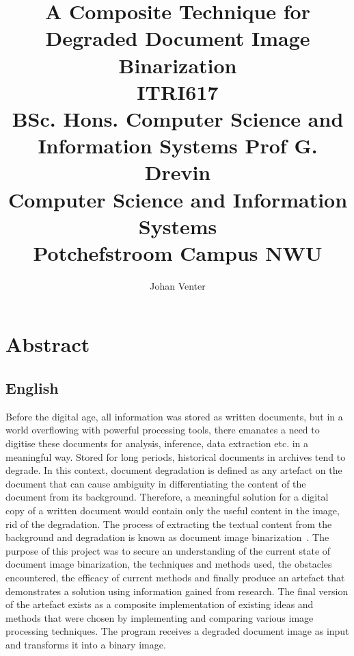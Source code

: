 \documentclass[a4paper, 12pt]{report}
\title{
    A Composite Technique for Degraded Document Image Binarization \\[12pt]
    \large
    ITRI617 \\[10pt]
    BSc. Hons. Computer Science and Information Systems
    Prof G. Drevin \\[10pt]
    Computer Science and Information Systems \\[10pt]
    Potchefstroom Campus NWU
}
\author{Johan Venter}
\begin{document}
\maketitle
\newpage

\tableofcontents
\newpage

\chapter{Abstract}
\section{English}
Before the digital age, all information was stored as written documents, but in
a world overflowing with powerful processing tools, there emanates a need to
digitise these documents for analysis, inference, data extraction etc. in a
meaningful way. Stored for long periods, historical documents in archives tend
to degrade. In this context, document degradation is defined as any artefact on
the document that can cause ambiguity in differentiating the content of the
document from its background. Therefore, a meaningful solution for a digital
copy of a written document would contain only the useful content in the image,
rid of the degradation. The process of extracting the textual content from the
background and degradation is known as document image
binarization~\cite{su2012robust}. The purpose of this project was to secure an
understanding of the current state of document image binarization, the
techniques and methods used, the obstacles encountered, the efficacy of current
methods and finally produce an artefact that demonstrates a solution using
information gained from research. The final version of the artefact exists as a
composite implementation of existing ideas and methods that were chosen by
implementing and comparing various image processing techniques. The program
receives a degraded document image as input and transforms it into a binary
image.
\end{document}

